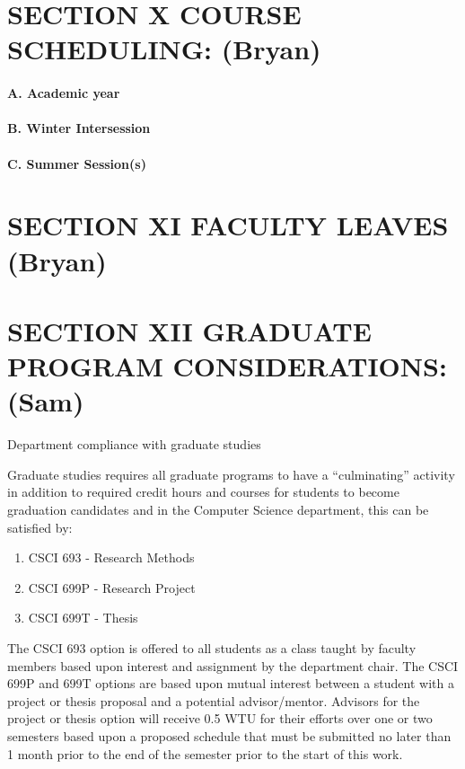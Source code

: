 \documentclass{scrartcl}
\begin{document}
\section*{SECTION X COURSE SCHEDULING: (Bryan)}
{}


\paragraph{A. Academic year}

\paragraph{B. Winter Intersession}

\paragraph{C. Summer Session(s)}


\section*{SECTION XI FACULTY LEAVES (Bryan)}
{}


\section*{SECTION XII GRADUATE PROGRAM CONSIDERATIONS: (Sam)}
{}


Department compliance with graduate studies

Graduate studies requires all graduate programs to have a “culminating” activity in addition to required credit hours and courses for students to become graduation candidates and in the Computer Science department, this can be satisfied by:

\begin{enumerate}
\item CSCI 693 - Research Methods
\item CSCI 699P - Research Project
\item CSCI 699T - Thesis
\end{enumerate}

The CSCI 693 option is offered to all students as a class taught by faculty members based upon interest and assignment by the department chair.  The CSCI 699P and 699T options are based upon mutual interest between a student with a project or thesis proposal and a potential advisor/mentor. Advisors for the project or thesis option will receive 0.5 WTU for their efforts over one or two semesters based upon a proposed schedule that must be submitted no later than 1 month prior to the end of the semester prior to the start of this work.
\end{document}
